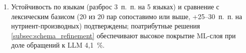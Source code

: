\begin{enumerate}[label=\arabic*)]
    \item Устойчивость по языкам (разброс 3~п.~п. на 5 языках) и сравнение с лексическим базисом (20 из 20 пар сопоставимо или выше, +25--30~п.~п. на нутриент-производных) подтверждены; поатрибутные решения \ref{subsec:schema_refinement} обеспечивают высокое покрытие ML-слоя при доле обращений к LLM 4,1~\%.
\end{enumerate}
